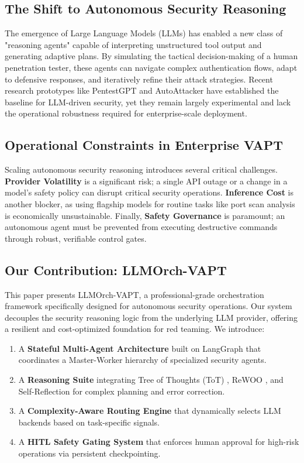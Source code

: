 \documentclass[conference,compsoc]{IEEEtran}
\begin{document}
\subsection{The Shift to Autonomous Security Reasoning}
The emergence of Large Language Models (LLMs) has enabled a new class of "reasoning agents" capable of interpreting unstructured tool output and generating adaptive plans. By simulating the tactical decision-making of a human penetration tester, these agents can navigate complex authentication flows, adapt to defensive responses, and iteratively refine their attack strategies. Recent research prototypes like PentestGPT \cite{pentestgpt} and AutoAttacker \cite{autoattacker} have established the baseline for LLM-driven security, yet they remain largely experimental and lack the operational robustness required for enterprise-scale deployment.

\subsection{Operational Constraints in Enterprise VAPT}
Scaling autonomous security reasoning introduces several critical challenges. \textbf{Provider Volatility} is a significant risk; a single API outage or a change in a model's safety policy can disrupt critical security operations. \textbf{Inference Cost} is another blocker, as using flagship models for routine tasks like port scan analysis is economically unsustainable. Finally, \textbf{Safety Governance} is paramount; an autonomous agent must be prevented from executing destructive commands through robust, verifiable control gates.

\subsection{Our Contribution: LLMOrch-VAPT}
This paper presents LLMOrch-VAPT, a professional-grade orchestration framework specifically designed for autonomous security operations. Our system decouples the security reasoning logic from the underlying LLM provider, offering a resilient and cost-optimized foundation for red teaming. We introduce:
\begin{enumerate}
    \item A \textbf{Stateful Multi-Agent Architecture} built on LangGraph \cite{langgraph} that coordinates a Master-Worker hierarchy of specialized security agents.
    \item A \textbf{Reasoning Suite} integrating Tree of Thoughts (ToT) \cite{tot}, ReWOO \cite{rewoo}, and Self-Reflection \cite{reflexion} for complex planning and error correction.
    \item A \textbf{Complexity-Aware Routing Engine} that dynamically selects LLM backends based on task-specific signals.
    \item A \textbf{HITL Safety Gating System} that enforces human approval for high-risk operations via persistent checkpointing.
\end{enumerate}
\end{document}
